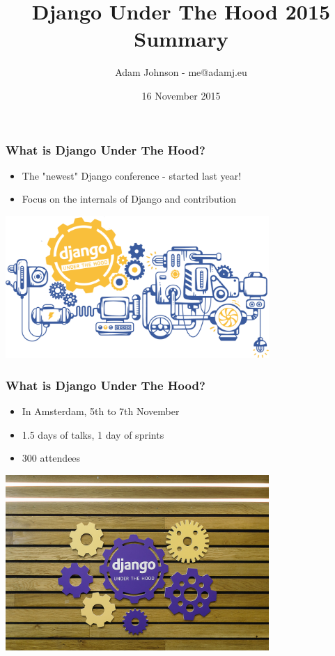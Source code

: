 \documentclass{beamer}
\title{Django Under The Hood 2015 Summary}
\author{Adam Johnson - me@adamj.eu}
\date{16 November 2015}
\begin{document}
\maketitle


\begin{frame}[fragile]\frametitle{What is Django Under The Hood?}

    \begin{itemize}
        \item The "newest" Django conference - started last year!
        \item Focus on the internals of Django and contribution
    \end{itemize}

    \begin{center}
        \includegraphics[width=10cm]{duth-header}
    \end{center}

\end{frame}


\begin{frame}[fragile]\frametitle{What is Django Under The Hood?}

    \begin{itemize}
        \item In Amsterdam, 5th to 7th November
        \item 1.5 days of talks, 1 day of sprints
        \item 300 attendees
    \end{itemize}

    \begin{center}
        \includegraphics[width=10cm]{duth-cogs}
    \end{center}

\end{frame}
\end{document}

